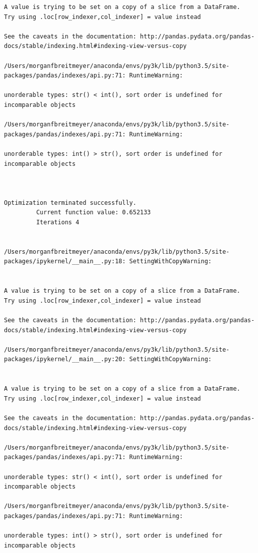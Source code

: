 \begin{lstlisting}
A value is trying to be set on a copy of a slice from a DataFrame.
Try using .loc[row_indexer,col_indexer] = value instead

See the caveats in the documentation: http://pandas.pydata.org/pandas-docs/stable/indexing.html#indexing-view-versus-copy

/Users/morganfbreitmeyer/anaconda/envs/py3k/lib/python3.5/site-packages/pandas/indexes/api.py:71: RuntimeWarning:

unorderable types: str() < int(), sort order is undefined for incomparable objects

/Users/morganfbreitmeyer/anaconda/envs/py3k/lib/python3.5/site-packages/pandas/indexes/api.py:71: RuntimeWarning:

unorderable types: int() > str(), sort order is undefined for incomparable objects



Optimization terminated successfully.
         Current function value: 0.652133
         Iterations 4


/Users/morganfbreitmeyer/anaconda/envs/py3k/lib/python3.5/site-packages/ipykernel/__main__.py:18: SettingWithCopyWarning:


A value is trying to be set on a copy of a slice from a DataFrame.
Try using .loc[row_indexer,col_indexer] = value instead

See the caveats in the documentation: http://pandas.pydata.org/pandas-docs/stable/indexing.html#indexing-view-versus-copy

/Users/morganfbreitmeyer/anaconda/envs/py3k/lib/python3.5/site-packages/ipykernel/__main__.py:20: SettingWithCopyWarning:


A value is trying to be set on a copy of a slice from a DataFrame.
Try using .loc[row_indexer,col_indexer] = value instead

See the caveats in the documentation: http://pandas.pydata.org/pandas-docs/stable/indexing.html#indexing-view-versus-copy

/Users/morganfbreitmeyer/anaconda/envs/py3k/lib/python3.5/site-packages/pandas/indexes/api.py:71: RuntimeWarning:

unorderable types: str() < int(), sort order is undefined for incomparable objects

/Users/morganfbreitmeyer/anaconda/envs/py3k/lib/python3.5/site-packages/pandas/indexes/api.py:71: RuntimeWarning:

unorderable types: int() > str(), sort order is undefined for incomparable objects




\end{lstlisting}
